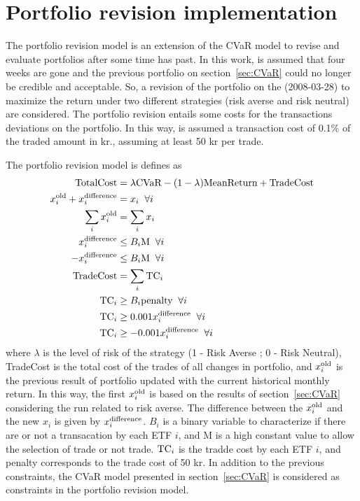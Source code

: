\section{Portfolio revision implementation}
The portfolio revision model is an extension of the CVaR model to revise and evaluate portfolios after some time has past.
In this work, is assumed that four weeks are gone and the previous portfolio on section~\ref{sec:CVaR} could no longer be credible and acceptable.
So, a revision of the portfolio on the (2008-03-28) to maximize the return under two different strategies (risk averse and risk neutral) are considered.
The portfolio revision entails some costs for the transactions deviations on the portfolio.
In this way, is assumed a transaction cost of 0.1\% of the traded amount in kr., assuming at least 50 kr per trade.

The portfolio revision model is defines as
\begin{align}
\textup{TotalCost} &= \lambda \textup{CVaR} - {\left( 1 - \lambda \right)} \textup{MeanReturn} + \textup{TradeCost} \\
x^{\textup{old}}_{i} + x^{\textup{difference}}_{i} &= x_{i} \; \; \forall i \\
\sum_{i} x^{\textup{old}}_{i} &= \sum_{i} x_{i} \\
x^{\textup{difference}}_{i} &\le B_{i} \textup{M} \; \; \forall i \\
-x^{\textup{difference}}_{i} &\le B_{i} \textup{M} \; \; \forall i \\
\textup{TradeCost} &= \sum_{i} \textup{TC}_{i} \\
\textup{TC}_{i} &\ge B_{i} \textup{penalty} \; \; \forall i \\
\textup{TC}_{i} &\ge 0.001 x^{\textup{difference}}_{i} \; \; \forall i \\
\textup{TC}_{i} &\ge - 0.001 x^{\textup{difference}}_{i} \; \; \forall i 
\end{align}
where $\lambda$ is the level of risk of the strategy (1 - Risk Averse ; 0 - Risk Neutral), TradeCost is the total cost of the trades of all changes in portfolio, and $x^{\textup{old}}_{i}$ is the previous result of portfolio updated with the current historical monthly return.
In this way, the first $x^{\textup{old}}_{i}$ is based on the results of section~\ref{sec:CVaR} considering the run related to risk averse.
The difference between the $x^{\textup{old}}_{i}$ and the new $x_{i}$ is given by $x^{\textup{difference}}_{i}$.
$B_{i}$ is a binary variable to characterize if there are or not a transacation by each ETF $i$, and M is a high constant value to allow the selection of trade or not trade.
$\textup{TC}_{i}$ is the tradde cost by each ETF $i$, and penalty corresponds to the trade cost of 50 kr.
In addition to the previous constraints, the CVaR model presented in section~\ref{sec:CVaR} is considered as constraints in the portfolio revision model.

